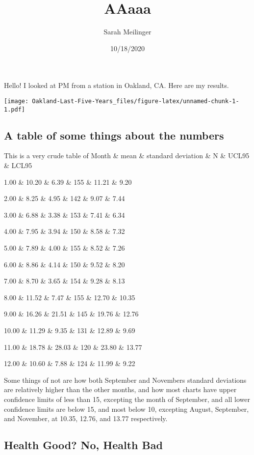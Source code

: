 \documentclass[]{article}
\title{AAaaa}
\author{Sarah Meilinger}
\date{10/18/2020}
\begin{document}
\maketitle

Hello! I looked at PM from a station in Oakland, CA. Here are my
results.

\texttt{[image: Oakland-Last-Five-Years\_files/figure-latex/unnamed-chunk-1-1.pdf]}

\hypertarget{a-table-of-some-things-about-the-numbers}{%
\subsection{A table of some things about the
numbers}\label{a-table-of-some-things-about-the-numbers}}

This is a very crude table of Month \& mean \& standard deviation \& N
\& UCL95 \& LCL95

1.00 \& 10.20 \& 6.39 \& 155 \& 11.21 \& 9.20

2.00 \& 8.25 \& 4.95 \& 142 \& 9.07 \& 7.44

3.00 \& 6.88 \& 3.38 \& 153 \& 7.41 \& 6.34

4.00 \& 7.95 \& 3.94 \& 150 \& 8.58 \& 7.32

5.00 \& 7.89 \& 4.00 \& 155 \& 8.52 \& 7.26

6.00 \& 8.86 \& 4.14 \& 150 \& 9.52 \& 8.20

7.00 \& 8.70 \& 3.65 \& 154 \& 9.28 \& 8.13

8.00 \& 11.52 \& 7.47 \& 155 \& 12.70 \& 10.35

9.00 \& 16.26 \& 21.51 \& 145 \& 19.76 \& 12.76

10.00 \& 11.29 \& 9.35 \& 131 \& 12.89 \& 9.69

11.00 \& 18.78 \& 28.03 \& 120 \& 23.80 \& 13.77

12.00 \& 10.60 \& 7.88 \& 124 \& 11.99 \& 9.22

Some things of not are how both September and Novembers standard
deviations are relatively higher than the other months, and how most
charts have upper confidence limits of less than 15, excepting the month
of September, and all lower confidence limits are below 15, and most
below 10, excepting August, September, and November, at 10.35, 12.76,
and 13.77 respectively.

\hypertarget{health-good-no-health-bad}{%
\subsection{Health Good? No, Health
Bad}\label{health-good-no-health-bad}}
\end{document}
